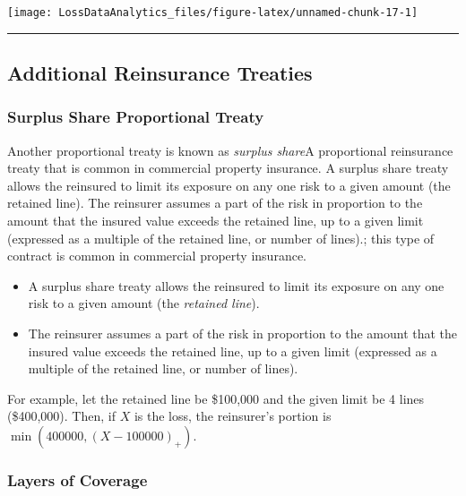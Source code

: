 \documentclass[]{book}
\providecommand{\tightlist}{%
  \setlength{\itemsep}{0pt}\setlength{\parskip}{0pt}}
\theoremstyle{definition}
\theoremstyle{definition}
\theoremstyle{definition}
\theoremstyle{remark}
\begin{document}
\begin{center}\texttt{[image: LossDataAnalytics\_files/figure-latex/unnamed-chunk-17-1]} \end{center}

\begin{center}\rule{0.5\linewidth}{\linethickness}\end{center}

\subsection{Additional Reinsurance Treaties}\label{S:AdditionalRe}

\subsubsection{Surplus Share Proportional
Treaty}\label{surplus-share-proportional-treaty}

Another proportional treaty is known as \emph{surplus share}{A
proportional reinsurance treaty that is common in commercial property
insurance. A surplus share treaty allows the reinsured to limit its
exposure on any one risk to a given amount (the retained line). The
reinsurer assumes a part of the risk in proportion to the amount that
the insured value exceeds the retained line, up to a given limit
(expressed as a multiple of the retained line, or number of lines).};
this type of contract is common in commercial property insurance.

\begin{itemize}
\tightlist
\item
  A surplus share treaty allows the reinsured to limit its exposure on
  any one risk to a given amount (the \emph{retained line}).
\item
  The reinsurer assumes a part of the risk in proportion to the amount
  that the insured value exceeds the retained line, up to a given limit
  (expressed as a multiple of the retained line, or number of lines).
\end{itemize}

For example, let the retained line be \$100,000 and the given limit be 4
lines (\$400,000). Then, if \(X\) is the loss, the reinsurer's portion
is \(\min(400000, (X-100000)_+)\).

\subsubsection{Layers of Coverage}\label{layers-of-coverage}
\end{document}
